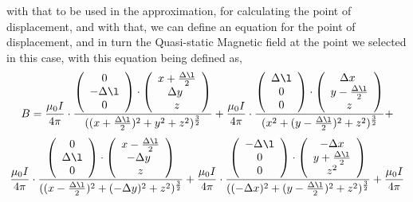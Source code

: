 \documentclass[]{article}
\begin{document}
with that to be used in the approximation, for calculating the point of displacement, and with that, we can define an equation for the point of displacement, and in turn the Quasi-static Magnetic field at the point we selected in this case, with this equation being defined as,
\[B = \frac{\mu_0I}{4\pi} \cdot \frac{ \left(\begin{array}{c} 
0 \\
-\Delta\l \\
0 
\end{array}\right) \cdot \left(\begin{array}{c}
x + \frac{\Delta\l}{2} \\
\Delta{y}\ \\
z
\end{array}\right)}{((x + \frac{\Delta\l}{2}) ^ 2 + y^2 + z^2)^\frac{3}{2}} + \frac{\mu_0I}{4\pi}
\linebreak
\cdot \frac{\left(\begin{array}{c}
\Delta\l \\
0 \\
0
\end{array}\right) \cdot \left(\begin{array}{c}
\Delta{x}\ \\
y - \frac{\Delta\l}{2} \\
z
\end{array}\right)}{(x^2 + (y - \frac{\Delta\l}{2})^2 + z^2)^ \frac{3}{2}} + \]
\[\frac{\mu_0I}{4\pi} 
\cdot \frac{\left(\begin{array}{c}
0 \\
\Delta\l \\
0
\end{array}\right) \cdot \left(\begin{array}{c}
x - \frac{\Delta\l}{2} \\
-\Delta{y}\ \\
z
\end{array}\right)}{((x - \frac{\Delta\l}{2})^2 + (-\Delta{y})^2 + z^2)^\frac{3}{2}} + \frac{\mu_0I}{4\pi} \cdot \frac{\left(\begin{array}{c}
-\Delta\l \\
0 \\
0
\end{array}\right) \cdot \left(\begin{array}{c}
-\Delta{x} \\ 
y + \frac{\Delta\l}{2} \\
z^2
\end{array}\right)}{((-\Delta{x})^2 + (y - \frac{\Delta\l}{2})^2 + z^2)^\frac{3}{2}} + \frac{\mu_0I}{4\pi}\]
\end{document}
